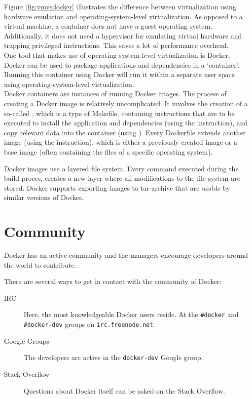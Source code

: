 Figure \ref{fig:vmvsdocker} illustrates the difference between virtualization using hardware emulation and operating-system-level virtualization. As opposed to a virtual machine, a container does not have a guest operating system. Additionally, it does not need a hypervisor for emulating virtual hardware and trapping privileged instructions. This saves a lot of performance overhead. \\

One tool that makes use of operating-system-level virtualization is Docker. Docker can be used to package applications and dependencies in a `container'. Running this container using Docker will run it within a separate user space using operating-system-level virtualization. \\
Docker containers are instances of running Docker images. The process of creating a Docker image is relatively uncomplicated. It involves the creation of a so-called , which is a type of Makefile, containing instructions that are to be executed to install the application and dependencies (using the  instruction), and copy relevant data into the container (using ). Every Dockerfile extends another image (using the  instruction), which is either a previously created image or a base image (often containing the files of a specific operating system).

Docker images use a layered file system. Every command executed during the build-proces, creates a new layer where all modifications to the file system are stored.
Docker supports exporting images to tar-archive that are usable by similar versions of Docker.



\section{Community}


Docker has an active community and the managers encourage developers around the world to contribute. \cite{dockeroswrittenfor}

There are several ways to get in contact with the community of Docker:
\begin{description}

\item [IRC] Here, the most knowledgeable Docker users reside. At the \verb|#docker| and \verb|#docker-dev| groups on \verb|irc.freenode.net|.

\item [Google Groups] The developers are active in the \verb|docker-dev| Google group.

\item [Stack Overflow] Questions about Docker itself can be asked on the Stack Overflow. 

\end{description}

